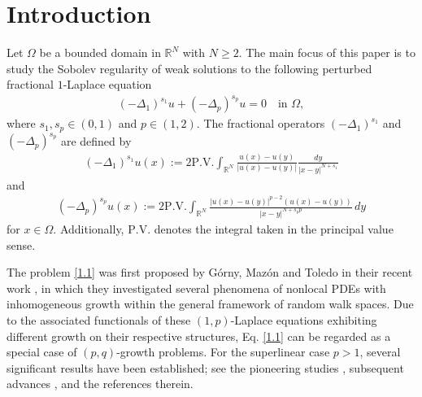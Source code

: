 \documentclass[reqno,10pt]{amsart}
\numberwithin{equation}{section}
\begin{document}
\section{Introduction}
Let $\Omega$ be a bounded domain in $\mathbb{R}^N$ with $N\ge2$. The main focus of this paper is to study the Sobolev regularity of weak solutions to the following perturbed fractional $1$-Laplace equation
\begin{align}
	\label{1.1}
	(-\Delta_1)^{s_1}u+(-\Delta_p)^{s_p}u=0\quad\text{in }\Omega,
\end{align}
where $s_1, s_p\in (0, 1)$ and $p\in(1, 2)$. The fractional operators $(-\Delta_1)^{s_1}$ and $(-\Delta_p)^{s_p}$ are  defined by
\begin{align*}
	(-\Delta_1)^{s_1}u(x):=2\mathrm{P.V.}\int_{\mathbb{R}^N}\frac{u(x)-u(y)}{|u(x)-u(y)|}\frac{dy}{|x-y|^{N+s_1}}
\end{align*}
and
\begin{align*}
	(-\Delta_p)^{s_p}u(x):=2\mathrm{P.V.}\int_{\mathbb{R}^N}\frac{|u(x)-u(y)|^{p-2}(u(x)-u(y))}{|x-y|^{N+s_p p}}\,dy
\end{align*}
for $x\in \Omega$. Additionally, $\mathrm{P.V.}$ denotes the integral taken in the principal value sense. 

The problem \eqref{1.1} was first proposed by G\'{o}rny, Maz\'{o}n and Toledo in their recent work \cite{GMT24}, in which they investigated several phenomena of nonlocal PDEs with inhomogeneous growth within the general framework of random walk spaces. Due to the associated functionals of these $(1, p)$-Laplace equations exhibiting different growth on their respective structures, Eq. \eqref{1.1} can be regarded as a special case of $(p, q)$-growth problems. For the superlinear case $p>1$, several significant results have been established; see the pioneering studies \cite{M89, M91}, subsequent advances \cite{BM20, CMM24, M21, MR21, DM2301}, and the references therein.
\end{document}
